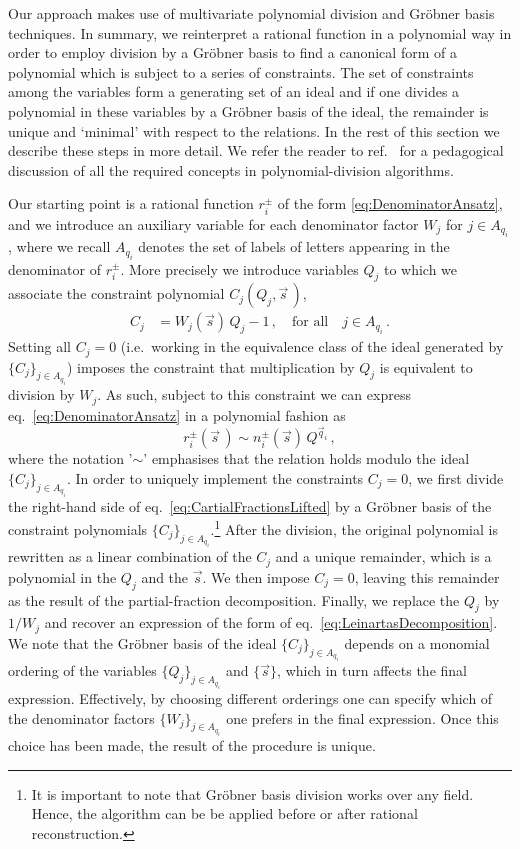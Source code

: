 Our approach makes use of multivariate polynomial division and
Gröbner basis techniques. In summary, we reinterpret a rational
function in a polynomial way in order to employ division by a Gröbner basis
to find a canonical form of a
polynomial which is subject to a series of constraints. The set of
constraints among the variables form a generating set of an ideal and
if one divides a polynomial in these variables by a Gröbner basis of
the ideal, the remainder is unique and `minimal' with respect to the
relations. In the rest of this section we describe these steps in more
detail. We refer the reader to ref.~\cite{cox2013ideals} for a pedagogical
discussion of all the required concepts in polynomial-division algorithms.

Our starting point is a rational function $r_i^\pm$ 
of the form \eqref{eq:DenominatorAnsatz}, and 
we introduce an auxiliary variable for each
denominator factor $W_j$ for $j\in A_{q_i}$, where we recall $A_{q_i}$ denotes
the set of labels of letters appearing in the denominator of $r_i^\pm$.
More precisely we introduce variables $Q_j$ to which we
associate the constraint polynomial $C_j(Q_j, \vec s\,)$,
\begin{align}
    C_j &= W_j (\vec s) \, Q_j - 1\,, 
	\quad\mbox{for all}\quad  j \in  A_{q_i}\,.
   \label{eq:PartialFractionConstraints}
\end{align}
Setting all $C_j = 0$ (i.e.\  working in the equivalence class of the ideal 
generated by $\{ C_j \}_{j \in A_{q_i}}$)
imposes the constraint that multiplication by $Q_j$
is equivalent to division by $W_j$. 
As such, subject to this constraint we can
express eq.~\eqref{eq:DenominatorAnsatz} in a polynomial fashion as
\begin{equation}
    r_i^{\pm}(\vec{s}\,) \sim n_i^{\pm}(\vec s)\, Q^{\vec q_{i}}\,,
    \label{eq:CartialFractionsLifted}
\end{equation}
where the notation '$\sim$' emphasises that the relation holds modulo 
the ideal $\{ C_j \}_{j \in A_{q_i}}$.
In order to uniquely implement the constraints $C_j = 0$, we first divide
the right-hand side of eq.~\eqref{eq:CartialFractionsLifted} by a
Gröbner basis of the constraint polynomials 
$\{ C_j \}_{j \in A_{q_i}}$.\footnote{It is important to note that Gröbner 
basis division works over any
field. Hence, the algorithm can be be applied before or after rational reconstruction.}
After the division, the original polynomial is rewritten as a linear combination 
of the $C_j$ and a unique remainder, which is a polynomial in the $Q_j$ and the $\vec s$.
We then impose
$C_j=0$, leaving this remainder as the result of the 
partial-fraction decomposition. Finally, 
we replace the $Q_j$ by $1/W_j$ and recover an expression of the form 
of eq.~\eqref{eq:LeinartasDecomposition}. We note that
the Gröbner basis of the ideal $\{ C_j \}_{j \in A_{q_i}}$ depends on a 
monomial ordering of the variables $\{ Q_j \}_{j \in A_{q_i}}$ and $\{\vec s\}$, 
which in turn affects the final expression. Effectively, by choosing different
orderings one can specify which 
of the denominator factors $\{ W_j \}_{j \in A_{q_{i}}}$ one 
prefers in the final expression. Once this choice has been made,
the result of the procedure is unique.

